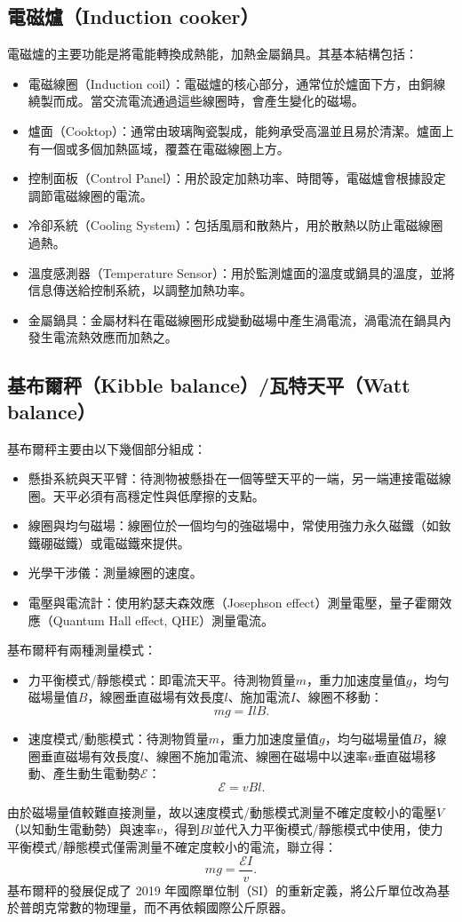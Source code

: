 \documentclass[a4paper,12pt]{report}
\begin{document}
\begin{itemize}
\subsection{電磁爐（Induction cooker）}
電磁爐的主要功能是將電能轉換成熱能，加熱金屬鍋具。其基本結構包括：
\begin{itemize}
\item 電磁線圈（Induction coil）：電磁爐的核心部分，通常位於爐面下方，由銅線繞製而成。當交流電流通過這些線圈時，會產生變化的磁場。
\item 爐面（Cooktop）：通常由玻璃陶瓷製成，能夠承受高溫並且易於清潔。爐面上有一個或多個加熱區域，覆蓋在電磁線圈上方。
\item 控制面板（Control Panel）：用於設定加熱功率、時間等，電磁爐會根據設定調節電磁線圈的電流。
\item 冷卻系統（Cooling System）：包括風扇和散熱片，用於散熱以防止電磁線圈過熱。
\item 溫度感測器（Temperature Sensor）：用於監測爐面的溫度或鍋具的溫度，並將信息傳送給控制系統，以調整加熱功率。
\item 金屬鍋具：金屬材料在電磁線圈形成變動磁場中產生渦電流，渦電流在鍋具內發生電流熱效應而加熱之。
\end{itemize}
\subsection{基布爾秤（Kibble balance）/瓦特天平（Watt balance）}
基布爾秤主要由以下幾個部分組成：
\begin{itemize}
\item 懸掛系統與天平臂：待測物被懸掛在一個等壁天平的一端，另一端連接電磁線圈。天平必須有高穩定性與低摩擦的支點。
\item 線圈與均勻磁場：線圈位於一個均勻的強磁場中，常使用強力永久磁鐵（如釹鐵硼磁鐵）或電磁鐵來提供。
\item 光學干涉儀：測量線圈的速度。
\item 電壓與電流計：使用約瑟夫森效應（Josephson effect）測量電壓，量子霍爾效應（Quantum Hall effect, QHE）測量電流。
\end{itemize}
基布爾秤有兩種測量模式：
\begin{itemize}
\item 力平衡模式/靜態模式：即電流天平。待測物質量$m$，重力加速度量值$g$，均勻磁場量值$B$，線圈垂直磁場有效長度$l$、施加電流$I$、線圈不移動：
\[mg=I l B.\]
\item 速度模式/動態模式：待測物質量$m$，重力加速度量值$g$，均勻磁場量值$B$，線圈垂直磁場有效長度$l$、線圈不施加電流、線圈在磁場中以速率$v$垂直磁場移動、產生動生電動勢$\mathcal{E}$：
\[\mathcal{E}=vB l.\]
\end{itemize}
由於磁場量值較難直接測量，故以速度模式/動態模式測量不確定度較小的電壓$V$（以知動生電動勢）與速率$v$，得到$B l$並代入力平衡模式/靜態模式中使用，使力平衡模式/靜態模式僅需測量不確定度較小的電流，聯立得：
\[mg = \frac{\mathcal{E} I}{v}.\]
基布爾秤的發展促成了 2019 年國際單位制（SI）的重新定義，將公斤單位改為基於普朗克常數的物理量，而不再依賴國際公斤原器。

\end{itemize}
\end{document}
